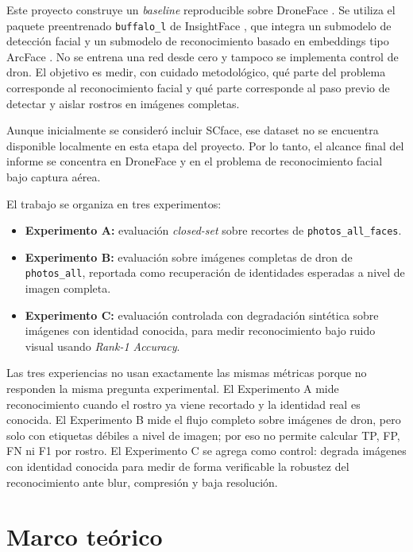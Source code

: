 \documentclass[11pt]{article}
\newcommand{\rankone}{\textit{Rank-1 Accuracy}}
\begin{document}
Este proyecto construye un \textit{baseline} reproducible sobre DroneFace \cite{hsu2017droneface}. Se utiliza el paquete preentrenado \texttt{buffalo\_l} de InsightFace \cite{insightface2026,insightface_model_zoo}, que integra un submodelo de detección facial y un submodelo de reconocimiento basado en embeddings tipo ArcFace \cite{deng2019arcface}. No se entrena una red desde cero y tampoco se implementa control de dron. El objetivo es medir, con cuidado metodológico, qué parte del problema corresponde al reconocimiento facial y qué parte corresponde al paso previo de detectar y aislar rostros en imágenes completas.

Aunque inicialmente se consideró incluir SCface, ese dataset no se encuentra disponible localmente en esta etapa del proyecto. Por lo tanto, el alcance final del informe se concentra en DroneFace y en el problema de reconocimiento facial bajo captura aérea.

El trabajo se organiza en tres experimentos:

\begin{itemize}
    \item \textbf{Experimento A:} evaluación \textit{closed-set} sobre recortes de \texttt{photos\_all\_faces}.
    \item \textbf{Experimento B:} evaluación sobre imágenes completas de dron de \texttt{photos\_all}, reportada como recuperación de identidades esperadas a nivel de imagen completa.
    \item \textbf{Experimento C:} evaluación controlada con degradación sintética sobre imágenes con identidad conocida, para medir reconocimiento bajo ruido visual usando \rankone.
\end{itemize}

Las tres experiencias no usan exactamente las mismas métricas porque no responden la misma pregunta experimental. El Experimento A mide reconocimiento cuando el rostro ya viene recortado y la identidad real es conocida. El Experimento B mide el flujo completo sobre imágenes de dron, pero solo con etiquetas débiles a nivel de imagen; por eso no permite calcular TP, FP, FN ni F1 por rostro. El Experimento C se agrega como control: degrada imágenes con identidad conocida para medir de forma verificable la robustez del reconocimiento ante blur, compresión y baja resolución.

\section{Marco teórico}
\label{sec:marco}
\end{document}
